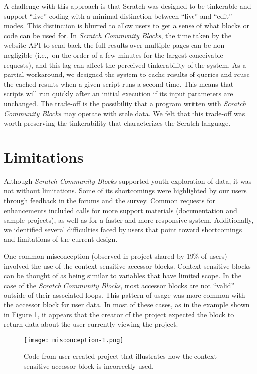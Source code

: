 \documentclass{sigchi}
\begin{document}
A challenge with this approach is that Scratch was designed to be tinkerable and support ``live'' coding \cite{maloney_scratch_2010} with a minimal distinction between ``live'' and ``edit'' modes. This distinction is blurred to allow users to get a sense of what blocks or code can be used for. In \emph{Scratch Community Blocks}, the time taken by the website API to send back the full results over multiple pages can be non-negligible (i.e.,~on the order of a few minutes for the largest conceivable requests), and this lag can affect the perceived tinkerability of the system. As a partial workaround, we designed the system to cache results of queries and reuse the cached results when a given script runs a second time. This means that scripts will run quickly after an initial execution if its input parameters are unchanged. The trade-off is the possibility that a program written with \emph{Scratch Community Blocks} may operate with stale data. We felt that this trade-off was worth preserving the tinkerability that characterizes the Scratch language.


\section{Limitations}

Although \emph{Scratch Community Blocks} supported youth exploration of data, it was not without limitations. Some of its shortcomings were highlighted by our users through feedback in the forums and the survey. Common requests for enhancements included calls for more support materials (documentation and sample projects), as well as for a faster and more responsive system. Additionally, we identified several difficulties faced by users that point toward shortcomings and limitations of the current design.

One common misconception (observed in project shared by 19\% of users) involved the use of the context-sensitive accessor blocks. Context-sensitive blocks can be thought of as being similar to variables that have limited scope. In the case of the \emph{Scratch Community Blocks}, most accessor blocks are not ``valid'' outside of their associated loops. This pattern of usage was more common with the accessor block for user data. In most of these cases, as in the example shown in Figure \ref{fig:misconception-1}, it appears that the creator of the project expected the block to return data about the user currently viewing the project.

\begin{figure}[h!]
\texttt{[image: misconception-1.png]}
\centering
\caption{Code from user-created project that illustrates how the context-sensitive accessor block is incorrectly used.}
\label{fig:misconception-1}
\end{figure}
\end{document}
